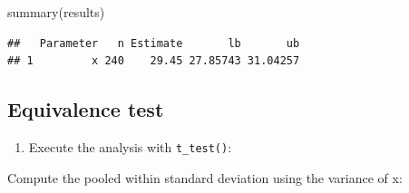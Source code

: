 \documentclass[
]{book}
\newenvironment{Shaded}{\begin{snugshade}}{\end{snugshade}}
\newcommand{\AttributeTok}[1]{\textcolor[rgb]{0.77,0.63,0.00}{#1}}
\newcommand{\CommentTok}[1]{\textcolor[rgb]{0.56,0.35,0.01}{\textit{#1}}}
\newcommand{\ConstantTok}[1]{\textcolor[rgb]{0.00,0.00,0.00}{#1}}
\newcommand{\DecValTok}[1]{\textcolor[rgb]{0.00,0.00,0.81}{#1}}
\newcommand{\FunctionTok}[1]{\textcolor[rgb]{0.00,0.00,0.00}{#1}}
\newcommand{\NormalTok}[1]{#1}
\newcommand{\OtherTok}[1]{\textcolor[rgb]{0.56,0.35,0.01}{#1}}
\newcommand{\SpecialCharTok}[1]{\textcolor[rgb]{0.00,0.00,0.00}{#1}}
\providecommand{\tightlist}{%
  \setlength{\itemsep}{0pt}\setlength{\parskip}{0pt}}
\begin{document}
\begin{Shaded}
\begin{Highlighting}[]
\FunctionTok{summary}\NormalTok{(results)}
\end{Highlighting}
\end{Shaded}

\begin{verbatim}
##   Parameter   n Estimate       lb       ub
## 1         x 240    29.45 27.85743 31.04257
\end{verbatim}

\hypertarget{equivalence-test}{%
\subsection{Equivalence test}\label{equivalence-test}}

\begin{enumerate}
\def\labelenumi{\arabic{enumi})}
\tightlist
\item
  Execute the analysis with \texttt{t\_test()}:
\end{enumerate}

\begin{Shaded}
\end{Shaded}

Compute the pooled within standard deviation using the variance of x:
\end{document}
